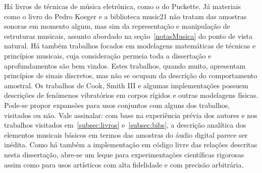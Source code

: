 Há livros de técnicas de música eletrônica, como o do Puckette. Já materiais como o livro do Pedro Koeger e a biblioteca music21 não tratam das amostras sonoras em momento algum, mas sim da representação e manipulação de estruturas musicais, assunto abordado na seção~\ref{notasMusica} do ponto de vista natural. Há também trabalhos focados em modelagens matemáticas de técnicas e princípios musicais, cuja consideração permeia toda a dissertação e aprofundamentos são bem vindos. Estes trabalhos, quando muito, apresentam princípios de sinais discretos, mas não se ocupam da descrição do comportamento amostral. Os trabalhos de Cook, Smith III e algumas implementações possuem descrições de fenômenos vibratórios em corpos rígidos e outras modelagens físicas. Pode-se propor expansões para usos conjuntos com alguns dos trabalhos, visitados ou não. Vale assinalar: com base na experiência prévia dos autores e nos trabalhos visitados em~\ref{subsec:livros} e~\ref{subsec:bibs}, a descrição analítica dos elementos musicais básicos em termos das amostras do áudio digital parece ser inédita. 
     Como há também a implementação em código livre das relações descritas nesta dissertação, abre-se um leque para experimentações científicas rigorosas assim como para usos artísticos com alta fidelidade e com precisão arbitrária. 
